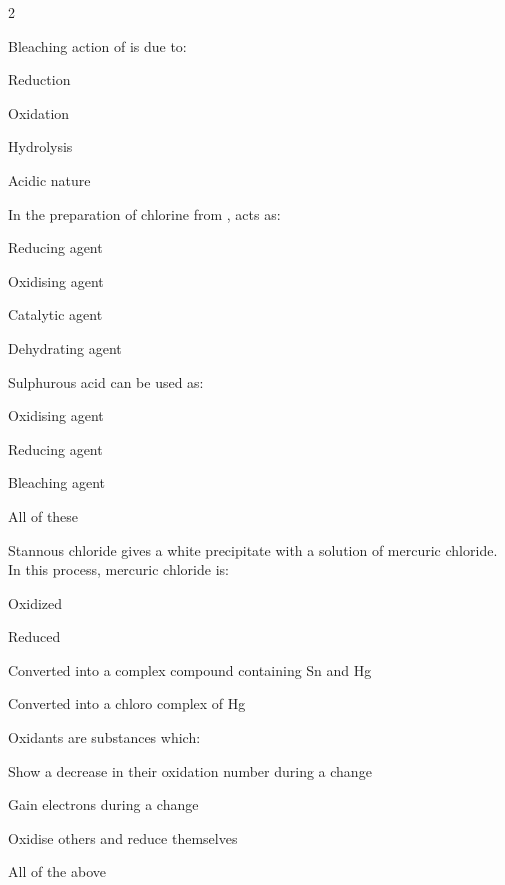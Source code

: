 \documentclass[10pt,a4paper]{article}
\begin{document}
\begin{multicols}{2}
\begin{questions}
\item Bleaching action of  is due to:
\begin{options}
  \item Reduction
  \item Oxidation
  \item Hydrolysis
  \item Acidic nature
\end{options}

\item In the preparation of chlorine from ,  acts as:
\begin{options}
  \item Reducing agent
  \item Oxidising agent
  \item Catalytic agent
  \item Dehydrating agent
\end{options}

\item Sulphurous acid can be used as:
\begin{options}
  \item Oxidising agent
  \item Reducing agent
  \item Bleaching agent
  \item All of these
\end{options}

\item Stannous chloride gives a white precipitate with a solution of mercuric chloride. In this process, mercuric chloride is:
\begin{options}
  \item Oxidized
  \item Reduced
  \item Converted into a complex compound containing Sn and Hg
  \item Converted into a chloro complex of Hg
\end{options}

\item Oxidants are substances which:
\begin{options}
  \item Show a decrease in their oxidation number during a change
  \item Gain electrons during a change
  \item Oxidise others and reduce themselves
  \item All of the above
\end{options}


\end{questions}
\end{multicols}
\end{document}
